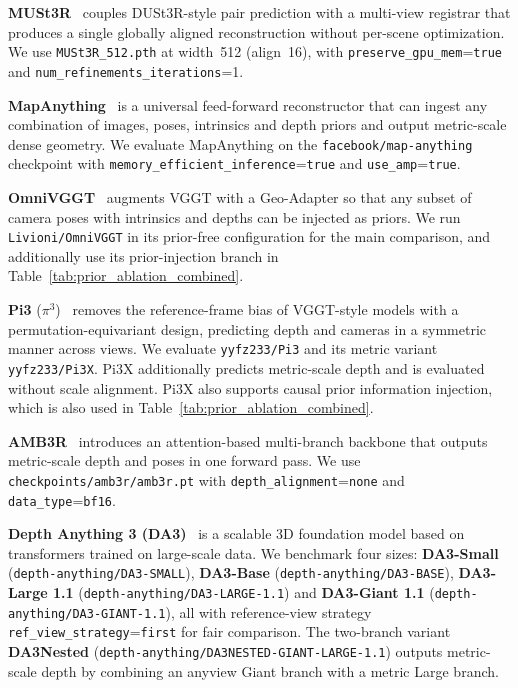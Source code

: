 \documentclass{llmxive}
\begin{document}
\textbf{MUSt3R}~\citep{cabon2025must3r} couples DUSt3R-style pair prediction with a multi-view registrar that produces a single globally aligned reconstruction without per-scene optimization.
%
We use \texttt{MUSt3R\_512.pth} at width~512 (align~16), with \texttt{preserve\_gpu\_mem}=\texttt{true} and \texttt{num\_refinements\_iterations}=1.

\textbf{MapAnything}~\citep{keetha2026mapanything} is a universal feed-forward reconstructor that can ingest any combination of images, poses, intrinsics and depth priors and output metric-scale dense geometry.
%
We evaluate MapAnything on the \texttt{facebook/map-anything} checkpoint with \texttt{memory\_efficient\_inference}=\texttt{true} and \texttt{use\_amp}=\texttt{true}.

\textbf{OmniVGGT}~\citep{peng2025omnivggt} augments VGGT with a Geo-Adapter so that any subset of camera poses with intrinsics and depths can be injected as priors.
%
We run \texttt{Livioni/OmniVGGT} in its prior-free configuration for the main comparison, and additionally use its prior-injection branch in Table~\ref{tab:prior_ablation_combined}.

\textbf{Pi3} (\textbf{$\pi^{3}$})~\citep{wang2025pi3} removes the reference-frame bias of VGGT-style models with a permutation-equivariant design, predicting depth and cameras in a symmetric manner across views.
%
We evaluate \texttt{yyfz233/Pi3} and its metric variant \texttt{yyfz233/Pi3X}.
%
Pi3X additionally predicts metric-scale depth and is evaluated without scale alignment.
%
Pi3X also supports causal prior information injection, which is also used in Table~\ref{tab:prior_ablation_combined}.

\textbf{AMB3R}~\citep{wang2025amb3r} introduces an attention-based multi-branch backbone that outputs metric-scale depth and poses in one forward pass.
%
We use \texttt{checkpoints/amb3r/amb3r.pt} with \texttt{depth\_alignment}=\texttt{none} and \texttt{data\_type}=\texttt{bf16}.

\textbf{Depth Anything 3 (DA3)}~\citep{lin2025depth} is a scalable 3D foundation model based on transformers trained on large-scale data.
%
We benchmark four sizes: \textbf{DA3-Small} (\texttt{depth-anything/DA3-SMALL}), \textbf{DA3-Base} (\texttt{depth-anything/DA3-BASE}), \textbf{DA3-Large 1.1} (\texttt{depth-anything/DA3-LARGE-1.1}) and \textbf{DA3-Giant 1.1} (\texttt{depth-anything/DA3-GIANT-1.1}), all with reference-view strategy \texttt{ref\_view\_strategy}=\texttt{first} for fair comparison.
%
The two-branch variant \textbf{DA3Nested} (\texttt{depth-anything/DA3NESTED-GIANT-LARGE-1.1}) outputs metric-scale depth by combining an anyview Giant branch with a metric Large branch.
%
\end{document}

